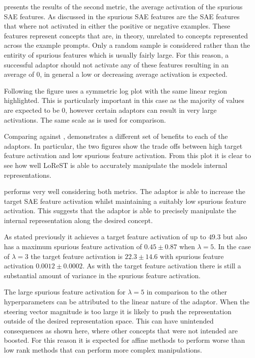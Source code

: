  presents the results of the second metric, the average activation of the spurious SAE features.
As discussed in  the spurious SAE features are the SAE features that where not activated in either the positive or negative examples.
These features represent concepts that are, in theory, unrelated to concepts represented across the example prompts.
Only a random sample is considered rather than the entirity of spurious features which is usually fairly large.
For this reason, a successful adaptor should not activate any of these features resulting in an average of 0, in general a low or decreasing average activation is expected.

Following  the figure uses a symmetric log plot with the same linear region highlighted.
This is particularly important in this case as the majority of values are expected to be 0, however certain adaptors can result in very large activations.
The same scale as  is used for comparison.

Comparing against ,  demonstrates a different set of benefits to each of the adaptors.
In particular, the two figures show the trade offs between high target feature activation and low spurious feature activation.
From this plot it is clear to see how well LoReST is able to accurately manipulate the models internal representations.

 performs very well considering both metrics.
The adaptor is able to increase the target SAE feature activation whilst maintaining a suitably low spurious feature activation.
This suggests that the adaptor is able to precisely manipulate the internal representation along the desired concept.

As stated previously it achieves a target feature activation of up to $49.3$ but also has a maximum spurious feature activation of $0.45 \pm 0.87$ when $\lambda = 5$.
In the case of $\lambda = 3$ the target feature activation is $22.3 \pm 14.6$ with spurious feature activation $0.0012 \pm 0.0002$.
As with the target feature activation there is still a substantial amount of variance in the spurious feature activation.

The large spurious feature activation for $\lambda = 5$ in comparison to the other hyperparameters can be attributed to the linear nature of the adaptor.
When the steering vector magnitude is too large it is likely to push the representation outside of the desired representation space.
This can have unintended consequences as shown here, where other concepts that were not intended are boosted.
For this reason it is expected for affine methods to perform worse than low rank methods that can perform more complex manipulations.

